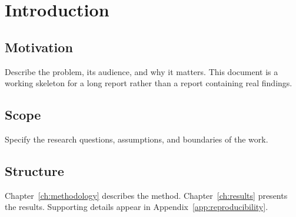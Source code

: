 \chapter{Introduction}
\label{ch:introduction}

\section{Motivation}

Describe the problem, its audience, and why it matters. This document is a
working skeleton for a long report rather than a report containing real findings.

\section{Scope}

Specify the research questions, assumptions, and boundaries of the work.

\section{Structure}

Chapter~\ref{ch:methodology} describes the method. Chapter~\ref{ch:results}
presents the results. Supporting details appear in Appendix~\ref{app:reproducibility}.
